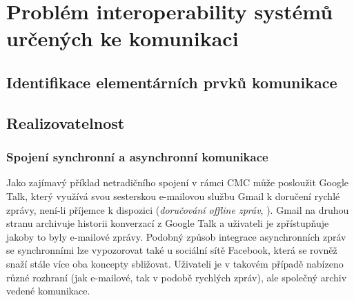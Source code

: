 \documentclass[12pt,oneside,final]{fithesis2}
\begin{document}













\chapter{Problém interoperability systémů určených ke komunikaci}\label{interoperabilityProblem}


\section{Identifikace elementárních prvků komunikace}\label{communicationElements}


\section{Realizovatelnost}\label{realizability}

\subsection{Spojení synchronní a asynchronní komunikace}\label{syncAsync}
Jako zajímavý příklad netradičního spojení v rámci CMC může posloužit Google Talk, který využívá svou sesterskou e-mailovou službu Gmail k doručení rychlé zprávy, není-li příjemce k dispozici ({\it doručování offline zpráv}, \cite{lindberg2006offline}). Gmail na druhou stranu archivuje historii konverzací z Google Talk a uživateli je zpřístupňuje jakoby to byly e-mailové zprávy. Podobný způsob integrace asynchronních zpráv se synchronními lze vypozorovat také u sociální sítě Facebook, která se rovněž snaží stále více oba koncepty sbližovat. Uživateli je v takovém případě nabízeno různé rozhraní (jak e-mailové, tak v podobě rychlých zpráv), ale společný archiv vedené komunikace.
\end{document}
